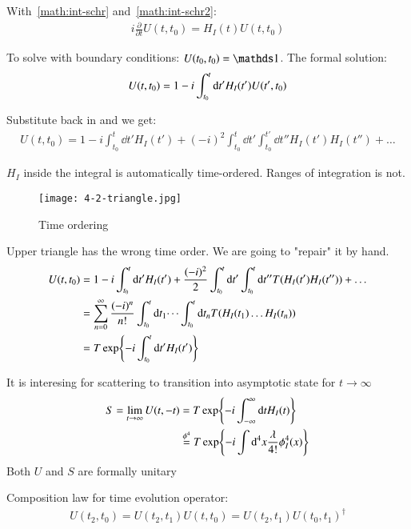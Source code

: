 With~\ref{math:int-schr} and~\ref{math:int-schr2}:
\begin{align}
	i\frac{\partial}{\partial t} U(t,t_0) = H_I(t)U(t,t_0)
\end{align}

To solve with boundary conditions: $U(t_0, t_0) = \id$. The formal solution:
\begin{align}
	U(t,t_0) = 1 - i \int_{t_0}^t \dd t' H_I(t')U(t',t_0) \notag
\end{align}

Substitute back in and we get:
\begin{align*}
	U(t,t_0) = 1- i \int_{t_0}^t \dd t' H_I(t') + (-i)^2 \int_{t_0}^t \dd t' \int^{t'}_{t_0} \dd t'' H_I(t') H_I(t'') + \dots
\end{align*}

$H_I$ inside the integral is automatically time-ordered. Ranges of integration is not. 

\begin{figure}[ht]
	\centering
	\texttt{[image: 4-2-triangle.jpg]}
	\caption{Time ordering}
	\label{fig:4-2-triangle}
\end{figure}

Upper triangle has the wrong time order. We are going to "repair" it by hand.
\begin{align}
	U(t,t_0) &= 1-i\int_{t_0}^t \dd t' H_I(t') + \frac{(-i)^2}{2} \int_{t_0}^t \dd t' \int^{t}_{t_0} \dd t'' T(H_I(t') H_I(t'')) + \dots \notag\\
			 &= \sum_{n=0}^{\infty} \frac{(-i)^n}{n!}\int_{t_0}^t \dd t_1 \dots \int_{t_0}^t \dd t_n T(H_I(t_1) \dots H_I(t_n))  \notag\\
			 &= T \exp{-i\int_{t_0}^t \dd t' H_I(t') }
\end{align}

It is interesing for scattering to transition into asymptotic state for $t \rightarrow \infty$
\begin{align}
	S = \lim_{t \rightarrow \infty} U(t,-t) &= T \exp{-i \int_{-\infty}^\infty \dd t H_I(t)} \\
	 &\stackrel{\phi^4}{=} T \exp{-i\int \dd^4 x \frac{\lambda}{4!} \phi_I^4(x)} \notag
\end{align}
Both $U$ and $S$ are formally unitary

Composition law for time evolution operator: 
\begin{align}
	U(t_2, t_0) = U(t_2, t_1) U(t,t_0) = U(t_2, t_1) U(t_0, t_1)^\dagger
\end{align}

